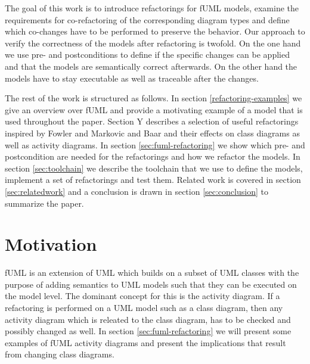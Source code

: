 \documentclass{llncs}
\begin{document}

The goal of this work is to introduce refactorings for fUML models, examine the requirements for co-refactoring of the
corresponding diagram types and define which co-changes have to be performed to preserve the behavior. Our approach to
verify
the correctness of the models after refactoring is twofold. On the one hand we use pre- and postconditions
\cite{rob99} to define if the specific changes can be applied and that the models are semantically correct afterwards.
On the other hand the models have to stay executable as well as traceable after the changes.



The rest of the work is structured as follows. In section \ref{refactoring-examples} we give an overview over fUML and provide
a motivating
example of a model that is used throughout the paper. Section Y describes a selection of useful refactorings inspired by
Fowler \cite{fow99} and Markovic and Baar \cite{DBLP:journals/sosym/MarkovicB08} and their effects on class diagrams as
well as activity diagrams. In section \ref{sec:fuml-refactoring} we show which pre- and postcondition are needed for the refactorings and
how we refactor the models. In section \ref{sec:toolchain} we describe the toolchain that we use to define the models, 
implement a set of refactorings and test them. Related work is covered in section \ref{sec:relatedwork} and a conclusion is drawn in 
section \ref{sec:conclusion} to summarize the paper.



\section{Motivation}
fUML is an extension of UML which builds on a subset of UML classes with the purpose of adding semantics to UML models 
such that they can be executed on the model level. The dominant concept for this is the activity diagram. If a refactoring 
is performed on a UML model such as a class diagram, then any activity diagram which is releated to the class diagram, has 
to be checked and possibly changed as well. In section \ref{sec:fuml-refactoring} we will present some examples of fUML 
activity diagrams and present the implications  that result from changing class 
diagrams.
\end{document}
